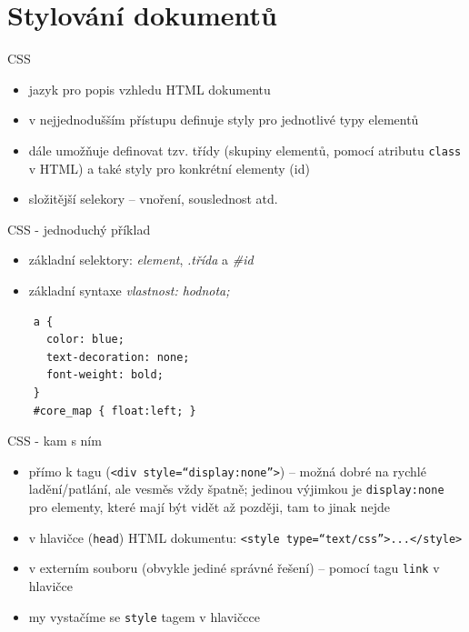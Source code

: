 \documentclass{beamer}
\begin{document}
\section{Stylování dokumentů}

\begin{frame}{CSS}
  \begin{itemize}
    \item jazyk pro popis vzhledu HTML dokumentu
    \item v nejjednodušším přístupu definuje styly pro jednotlivé typy elementů
    \item dále umožňuje definovat tzv. třídy (skupiny elementů, pomocí atributu \texttt{class} v HTML) a také styly pro konkrétní elementy (id)
    \item složitější selekory -- vnoření, souslednost atd.
  \end{itemize}
\end{frame}

\begin{frame}[fragile]{CSS - jednoduchý příklad}
  \begin{itemize}
    \item základní selektory: \emph{element}, \emph{.třída} a \emph{\#id}
    \item základní syntaxe \emph{vlastnost: hodnota;}
  \end{itemize}
  \scriptsize
  \begin{verbatim}
    a {
      color: blue;
      text-decoration: none;
      font-weight: bold;
    }
    #core_map { float:left; }
  \end{verbatim}
\end{frame}

\begin{frame}{CSS - kam s ním}
  \begin{itemize}
    \item přímo k tagu (\texttt{<div style=``display:none''>}) -- možná dobré na rychlé ladění/patlání, ale vesměs vždy špatně; jedinou výjimkou je \texttt{display:none} pro elementy, které mají být vidět až později, tam to jinak nejde
    \item v hlavičce (\texttt{head}) HTML dokumentu: \texttt{<style type=``text/css''>...</style>}
    \item v externím souboru (obvykle jediné správné řešení) -- pomocí tagu \texttt{link} v hlavičce
    \item my vystačíme se \texttt{style} tagem v hlavičcce
  \end{itemize}
\end{frame}
\end{document}
